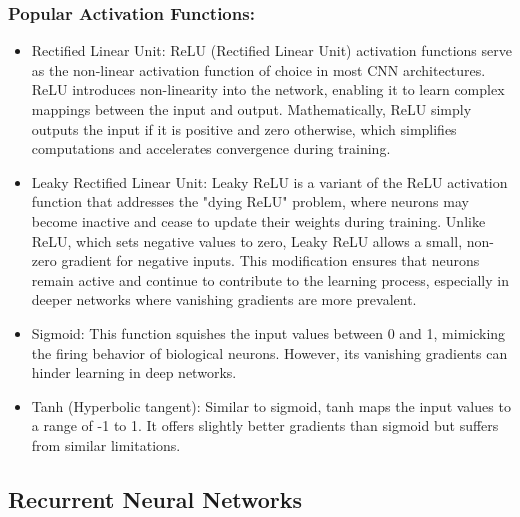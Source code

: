 \documentclass{article}
\begin{document}
\subsubsection{Popular Activation Functions:}

\begin{itemize}
\item[\ding{118}] Rectified Linear Unit:
ReLU (Rectified Linear Unit) activation functions serve as the non-linear activation function of choice in most CNN architectures. ReLU introduces non-linearity into the network, enabling it to learn complex mappings between the input and output. Mathematically, ReLU simply outputs the input if it is positive and zero otherwise, which simplifies computations and accelerates convergence during training.
\end{itemize}

\begin{itemize}
\item[\ding{118}] Leaky Rectified Linear Unit:
Leaky ReLU is a variant of the ReLU activation function that addresses the "dying ReLU" problem, where neurons may become inactive and cease to update their weights during training. Unlike ReLU, which sets negative values to zero, Leaky ReLU allows a small, non-zero gradient for negative inputs. This modification ensures that neurons remain active and continue to contribute to the learning process, especially in deeper networks where vanishing gradients are more prevalent.
\end{itemize}

\begin{itemize}
\item[\ding{118}] Sigmoid:
This function squishes the input values between 0 and 1, mimicking the firing behavior of biological neurons. However, its vanishing gradients can hinder learning in deep networks.
\end{itemize}

\begin{itemize}
\item[\ding{118}] Tanh (Hyperbolic tangent):
Similar to sigmoid, tanh maps the input values to a range of -1 to 1. It offers slightly better gradients than sigmoid but suffers from similar limitations.
\end{itemize}

\subsection{Recurrent Neural Networks}
\end{document}
